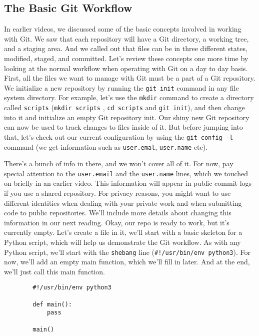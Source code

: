 	\subsection{The Basic Git Workflow}
		
	In earlier videos, we discussed some of the basic concepts involved in working with Git. We saw that each repository will have a Git directory, a working tree, and a staging area. And we called out that files can be in three different states, modified, staged, and committed. Let's review these concepts one more time by looking at the normal workflow when operating with Git on a day to day basis. First, all the files we want to manage with Git must be a part of a Git repository. We initialize a new repository by running the \verb|git init| command in any file system directory. For example, let's use the \verb|mkdir| command to create a directory called \texttt{scripts} (\texttt{mkdir scripts} , \texttt{cd scripts} and \texttt{git init}), and then change into it and initialize an empty Git repository init. Our shiny new Git repository can now be used to track changes to files inside of it. But before jumping into that, let's check out our current configuration by using the \verb|git config -l| command (we get information such as \texttt{user.emal}, \texttt{user.name} etc).
	
	There's a bunch of info in there, and we won't cover all of it. For now, pay special attention to the \verb|user.email| and the \verb|user.name| lines, which we touched on briefly in an earlier video. This information will appear in public commit logs if you use a shared repository. 
	For privacy reasons, you might want to use different identities when dealing with your private work and when submitting code to public repositories. We'll include more details about changing this information in our next reading. Okay, our repo is ready to work, but it's currently empty. Let's create a file in it, we'll start with a basic skeleton for a Python script, which will help us demonstrate the Git workflow. As with any Python script, we'll start with the \texttt{shebang} line (\verb|#!/usr/bin/env python3|). For now, we'll add an empty main function, which we'll fill in later. And at the end, we'll just call this main function.
	
	\begin{verbatim}
		#!/usr/bin/env python3
		
		def main():
			pass
		
		main()
	\end{verbatim}
	
